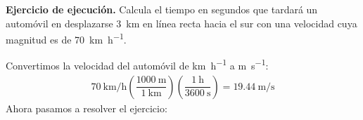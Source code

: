 \documentclass[12pt, letter]{exam}
\begin{document}
\begin{questions}
    \setcounter{question}{4} \question \textbf{Ejercicio de ejecución. } Calcula el tiempo en segundos que tardará un automóvil en desplazarse \SI{3}{\kilo\meter} en línea recta hacia el sur con una velocidad cuya magnitud es de \SI{70}{\kilo\meter\per\hour}.

    \vspace*{0.25cm}
    Convertimos la velocidad del automóvil de \unit{\kilo\meter\per\hour} a \unit{\meter\per\second}:
    \begin{align*}
        \SI[per-mode=fraction]{70}{\kilo\meter\per\hour} \left( \dfrac{\SI{1000}{\meter}}{\SI{1}{\kilo\meter}} \right) \left( \dfrac{\SI{1}{\hour}}{\SI{3600}{\second}} \right) = \SI[per-mode=fraction]{19.44}{\meter\per\second}
    \end{align*}
    Ahora pasamos a resolver el ejercicio:


\end{questions}
\end{document}
